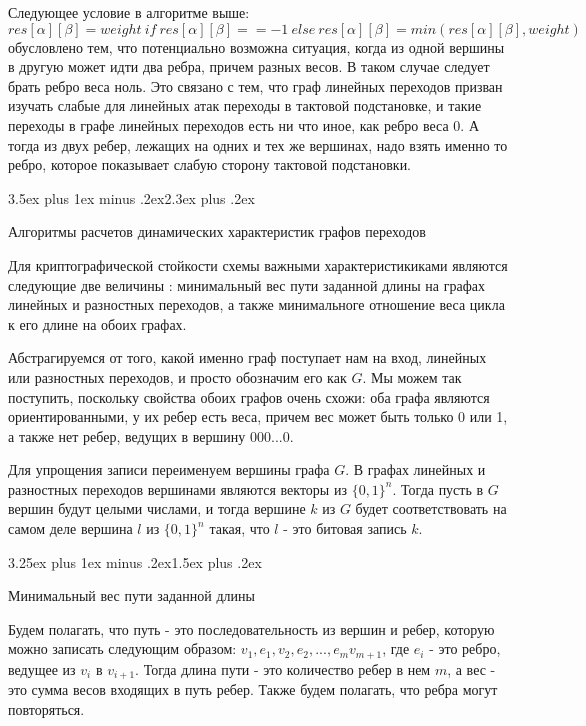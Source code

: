 \documentclass[a4paper,12pt]{report}
\makeatletter
\theoremstyle{plain} %
\theoremstyle{definition}
\theoremstyle{remark}
\renewcommand{\section}{\@startsection{section}{1}{18pt}%
{3.5ex plus 1ex minus .2ex}{2.3ex plus .2ex}%
{\normalfont\Large\bfseries\raggedright}}%
\renewcommand{\subsection}{\@startsection{subsection}{2}{18pt}%
{3.25ex plus 1ex minus .2ex}{1.5ex plus .2ex}%
{\normalfont\large\bfseries\raggedright}}%
\makeatother
\begin{document}
\begin{large}
Следующее условие в алгоритме выше: $$res[\alpha][\beta] = weight ~if~ res[\alpha][\beta] == -1 ~else~res[\alpha][\beta]=min(res[\alpha][\beta], weight)$$ обусловлено тем, что потенциально возможна ситуация, когда из одной вершины в другую может идти два ребра, причем разных весов. В таком случае следует брать ребро веса ноль. Это связано с тем, что граф линейных переходов призван изучать слабые для линейных атак переходы в тактовой подстановке, и такие переходы в графе линейных переходов есть ни что иное, как ребро веса 0. А тогда из двух ребер, лежащих на одних и тех же вершинах, надо взять именно то ребро, которое показывает слабую сторону тактовой подстановки.

\section{Алгоритмы расчетов динамических характеристик графов переходов}

Для криптографической стойкости схемы важными характеристикиками являются следующие две величины \cite{marchuk}: минимальный вес пути заданной длины на графах линейных и разностных переходов, а также минимальноге отношение веса цикла к его длине на обоих графах.

Абстрагируемся от того, какой именно граф поступает нам на вход, линейных или разностных переходов, и просто обозначим его как $G$. Мы можем так поступить, поскольку свойства обоих графов очень схожи: оба графа являются ориентированными, у их ребер есть веса, причем вес может быть только 0 или 1, а также нет ребер, ведущих в вершину 000...0.

Для упрощения записи переименуем вершины графа $G$. В графах линейных и разностных переходов вершинами являются векторы из $\{0, 1\}^n$. Тогда пусть в $G$ вершин будут целыми числами, и тогда вершине $k$ из $G$ будет соответствовать на самом деле вершина $l$ из $\{0, 1\}^n$ такая, что $l$ - это битовая запись $k$.

\subsection{Минимальный вес пути заданной длины}

Будем полагать, что путь - это последовательность из вершин и ребер, которую можно записать следующим образом: $v_1, e_1, v_2, e_2, ..., e_mv_{m+1}$, где $e_i$ - это ребро, ведущее из $v_i$ в $v_{i+1}$. Тогда длина пути - это количество ребер в нем $m$, а вес - это сумма весов входящих в путь ребер. Также будем полагать, что ребра могут повторяться.


\end{large}
\end{document}
